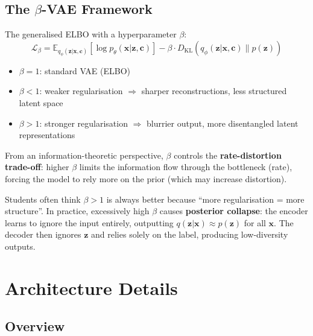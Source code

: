\documentclass[11pt,a4paper]{article}
\begin{document}
\subsection{The $\beta$-VAE Framework}

\begin{concept}
The generalised ELBO with a hyperparameter $\beta$:
\[
\mathcal{L}_\beta = \mathbb{E}_{q_\phi(\mathbf{z}|\mathbf{x},\mathbf{c})}\left[\log p_\theta(\mathbf{x}|\mathbf{z},\mathbf{c})\right] - \beta \cdot D_{\mathrm{KL}}\left(q_\phi(\mathbf{z}|\mathbf{x},\mathbf{c}) \| p(\mathbf{z})\right)
\]
\begin{itemize}
    \item $\beta = 1$: standard VAE (ELBO)
    \item $\beta < 1$: weaker regularisation $\Rightarrow$ sharper reconstructions, less structured latent space
    \item $\beta > 1$: stronger regularisation $\Rightarrow$ blurrier output, more disentangled latent representations
\end{itemize}
\end{concept}

From an information-theoretic perspective, $\beta$ controls the \textbf{rate-distortion trade-off}: higher $\beta$ limits the information flow through the bottleneck (rate), forcing the model to rely more on the prior (which may increase distortion).

\begin{errorbox}
Students often think $\beta > 1$ is always better because ``more regularisation = more structure''. In practice, excessively high $\beta$ causes \textbf{posterior collapse}: the encoder learns to ignore the input entirely, outputting $q(\mathbf{z}|\mathbf{x}) \approx p(\mathbf{z})$ for all $\mathbf{x}$. The decoder then ignores $\mathbf{z}$ and relies solely on the label, producing low-diversity outputs.
\end{errorbox}

\section{Architecture Details}

\subsection{Overview}
\end{document}
